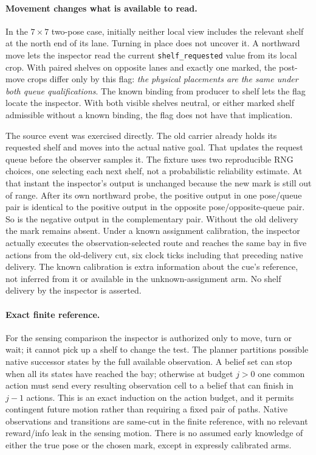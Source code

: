 \documentclass[11pt]{article}
\begin{document}
\paragraph{Movement changes what is available to read.}
In the \(7\times7\) two-pose case, initially neither local
view includes the relevant shelf at the north end of its
lane. Turning in place does not uncover it. A northward move
lets the inspector read the current \texttt{shelf\_requested}
value from its local crop. With paired shelves on opposite
lanes and exactly one marked, the post-move crops differ
only by this flag: \emph{the physical placements are the same
under both queue qualifications}. The known binding from
producer to shelf lets the flag locate the inspector. With
both visible shelves neutral, or either marked shelf admissible
without a known binding, the flag does not have that implication.

The source event was exercised directly. The old carrier already holds
its requested shelf and moves into the actual native goal. That
updates the request queue before the observer samples it.
The fixture uses two reproducible RNG choices, one selecting
each next shelf, not a probabilistic reliability estimate.
At that instant the inspector's output is unchanged because
the new mark is still out of range. After its own northward
probe, the positive output in one pose/queue pair is identical
to the positive output in the opposite pose/opposite-queue pair.
So is the negative output in the complementary pair.
Without the old delivery the mark remains absent.
Under a known assignment calibration, the inspector actually
executes the observation-selected route and reaches the same
bay in five actions from the old-delivery cut, six clock ticks
including that preceding native delivery. The known calibration
is extra information about the cue's reference, not inferred
from it or available in the unknown-assignment arm. No shelf
delivery by the inspector is asserted.

\paragraph{Exact finite reference.}
For the sensing comparison the inspector is authorized only
to move, turn or wait; it cannot pick up a shelf to change the
test. The planner partitions possible native successor states
by the full available observation. A belief set can stop when
all its states have reached the bay; otherwise at budget \(j>0\)
one common action must send every resulting observation cell
to a belief that can finish in \(j-1\) actions. This is an exact
induction on the action budget, and it permits contingent
future motion rather than requiring a fixed pair of paths.
Native observations and transitions are same-cut in the finite
reference, with no relevant reward/info leak in the sensing motion.
There is no assumed early knowledge of either the true pose or
the chosen mark, except in expressly calibrated arms.
\end{document}
